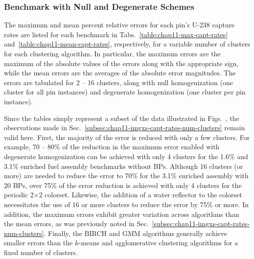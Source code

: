 \clearpage

\subsubsection{Benchmark with Null and Degenerate Schemes}
\label{subsec:chap11-imgxs-capt-rates-benchmark}

The maximum and mean percent relative errors for each pin's U-238 capture rates are listed for each benchmark in Tabs.~\ref{table:chap11-max-capt-rates} and~\ref{table:chap11-mean-capt-rates}, respectively, for a variable number of clusters for each clustering algorithm. In particular, the maximum errors are the maximum of the absolute values of the errors along with the appropriate sign, while the mean errors are the averages of the absolute error magnitudes. The errors are tabulated for 2 -- 16 clusters, along with null homogenization (one cluster for all pin instances) and degenerate homogenization (one cluster per pin instance).

Since the tables simply represent a subset of the data illustrated in Figs.~, the observations made in Sec.~\ref{subsec:chap11-imgxs-capt-rates-num-clusters} remain valid here. First, the majority of the error is reduced with only a few clusters. For example, 70 -- 80\% of the reduction in the maximum error enabled with degenerate homogenization can be achieved with only 4 clusters for the 1.6\% and 3.1\% enriched fuel assembly benchmarks without \acp{BP}. Although 16 clusters (or more) are needed to reduce the error to 70\% for the 3.1\% enriched assembly with 20 \acp{BP}, over 75\% of the error reduction is achieved with only 4 clusters for the periodic 2$\times$2 colorset. Likewise, the addition of a water reflector to the colorset necessitates the use of 16 or more clusters to reduce the error by 75\% or more. In addition, the maximum errors exhibit greater variation across algorithms than the mean errors, as was previously noted in Sec.~\ref{subsec:chap11-imgxs-capt-rates-num-clusters}. Finally, the BIRCH and \ac{GMM} algorithms generally achieve smaller errors than the $k$-means and agglomerative clustering algorithms for a fixed number of clusters.

